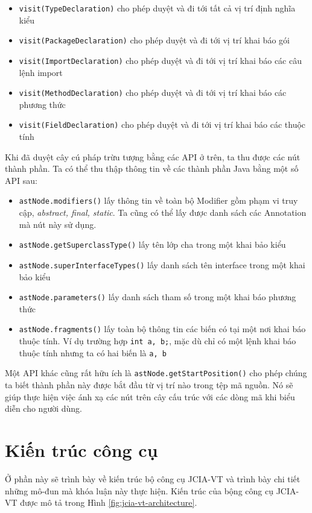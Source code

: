 \documentclass[12pt]{report}
\begin{document}
\begin{itemize}
	\item \texttt{visit(TypeDeclaration)} cho phép duyệt và đi tới tất cả vị trí định nghĩa kiểu
	\item \texttt{visit(PackageDeclaration)} cho phép duyệt và đi tới vị trí khai báo gói
	\item \texttt{visit(ImportDeclaration)} cho phép duyệt và đi tới vị trí khai báo các câu lệnh import
	\item \texttt{visit(MethodDeclaration)} cho phép duyệt và đi tới vị trí khai báo các phương thức
	\item \texttt{visit(FieldDeclaration)} cho phép duyệt và đi tới vị trí khai báo các thuộc tính
\end{itemize}

Khi đã duyệt cây cú pháp trừu tượng bằng các API ở trên, ta thu được các nút thành phần. Ta có thể thu thập thông tin về các thành phần Java bằng một số API sau:
\begin{itemize}
	\item \texttt{astNode.modifiers()} lấy thông tin về toàn bộ Modifier gồm phạm vi truy cập, \textit{abstract, final, static}. Ta cũng có thể lấy được danh sách các Annotation mà nút này sử dụng.
	\item \texttt{astNode.getSuperclassType()} lấy tên lớp cha trong một khai bảo kiểu
	\item \texttt{astNode.superInterfaceTypes()} lấy danh sách tên interface trong một khai bảo kiểu
	\item \texttt{astNode.parameters()} lấy danh sách tham số trong một khai báo phương thức
	\item \texttt{astNode.fragments()} lấy toàn bộ thông tin các biến có tại một nơi khai báo thuộc tính. Ví dụ trường hợp \texttt{int a, b;}, mặc dù chỉ có một lệnh khai báo thuộc tính nhưng ta có hai biến là \texttt{a, b}
\end{itemize}

Một API khác cũng rất hữu ích là \texttt{astNode.getStartPosition()} cho phép chúng ta biết thành phần này được bắt đầu từ vị trí nào trong tệp mã nguồn. Nó sẽ giúp thực hiện việc ánh xạ các nút trên cây cấu trúc với các dòng mã khi biểu diễn cho người dùng.

\section{Kiến trúc công cụ}
Ở phần này sẽ trình bày về kiến trúc bộ công cụ JCIA-VT và trình bày chi tiết những mô-đun mà khóa luận này thực hiện. Kiến trúc của bộng công cụ JCIA-VT được mô tả trong Hình \ref{fig:jcia-vt-architecture}.
\end{document}
